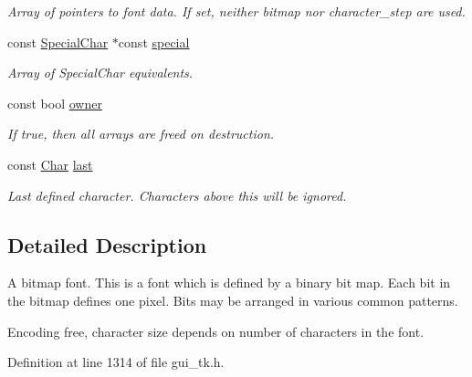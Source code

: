 \begin{DoxyCompactItemize}
\begin{DoxyCompactList}\small\item\em Array of pointers to font data. If set, neither {\itshape bitmap\/} nor {\itshape character\-\_\-step\/} are used. \end{DoxyCompactList}\item 
const \hyperlink{classGUI_1_1Font_af3c234cd3febe27dbe9c76e6cc5cad3a}{Special\-Char} $\ast$const \hyperlink{classGUI_1_1BitmapFont_a46f912c496e902dfc614e25261599718}{special}
\begin{DoxyCompactList}\small\item\em Array of Special\-Char equivalents. \end{DoxyCompactList}\item 
\hypertarget{classGUI_1_1BitmapFont_ac50042f33fedf2c8516294780ed6f128}{const bool \hyperlink{classGUI_1_1BitmapFont_ac50042f33fedf2c8516294780ed6f128}{owner}}\label{classGUI_1_1BitmapFont_ac50042f33fedf2c8516294780ed6f128}

\begin{DoxyCompactList}\small\item\em If {\ttfamily true}, then all arrays are freed on destruction. \end{DoxyCompactList}\item 
\hypertarget{classGUI_1_1BitmapFont_a3c992d29bbd0d35087365a8e5474686c}{const \hyperlink{namespaceGUI_af6b04b46d40197b4f00e553d7d1a3e4c}{Char} \hyperlink{classGUI_1_1BitmapFont_a3c992d29bbd0d35087365a8e5474686c}{last}}\label{classGUI_1_1BitmapFont_a3c992d29bbd0d35087365a8e5474686c}

\begin{DoxyCompactList}\small\item\em Last defined character. Characters above this will be ignored. \end{DoxyCompactList}\end{DoxyCompactItemize}


\subsection{Detailed Description}
A bitmap font. This is a font which is defined by a binary bit map. Each bit in the bitmap defines one pixel. Bits may be arranged in various common patterns. 

Encoding free, character size depends on number of characters in the font. 

Definition at line 1314 of file gui\-\_\-tk.\-h.



